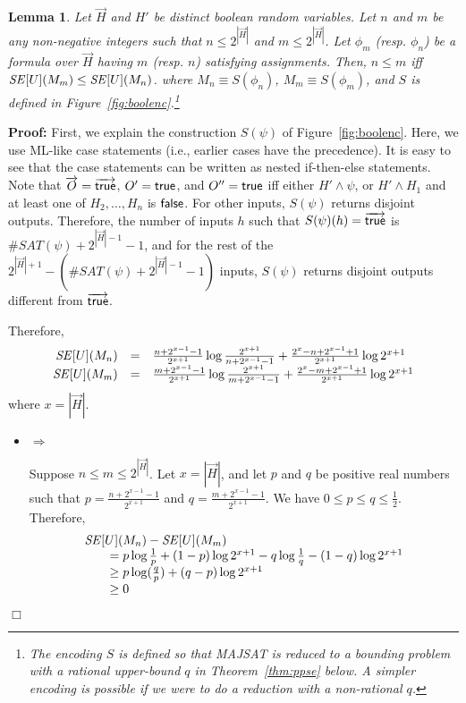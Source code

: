 \documentclass{llncs}
\newtheorem{lemma}[theorem]{Lemma}
\newenvironment{proof}{\noindent\rm{\bf Proof:}}{\hbox{$\Box$}\vspace*{0.2\baselineskip}}
\newcommand{\vect}[1]{\overrightarrow{{#1}}}
\begin{document}
\begin{lemma}
\label{lem:semonotone}
Let $\vect H$ and $H'$ be distinct boolean random variables.  Let $n$
and $m$ be any non-negative integers such that $n\le 2^{|{\vect H}|}$
and $m\le 2^{|\vect{H}|}$.  Let $\phi_m$ (resp. $\phi_n$) be a formula
over $\vect H$ having $m$ (resp. $n$) satisfying assignments. Then,
$n\le m$ iff ${\it SE}[U](M_m)\le{\it SE}[U](M_n)$.  where $M_n\equiv
S(\phi_n)$, $M_m\equiv S(\phi_m)$, and $S$ is defined in
Figure~\ref{fig:boolenc}.\footnote{The encoding $S$ is defined so
    that MAJSAT is reduced to a bounding problem with a rational
    upper-bound $q$ in Theorem~\ref{thm:ppse} below.  A simpler
    encoding is possible if we were to do a reduction with a
    non-rational $q$.}
\end{lemma}
\begin{proof}
  First, we explain the construction $S(\psi)$ of
  Figure~\ref{fig:boolenc}.  Here, we use ML-like case statements
  (i.e., earlier cases have the precedence).  It is easy to see that the case
  statements can be written as nested if-then-else statements. Note
  that $\vect{O}=\vect{\sf true}$, $O'={\sf true}$, and $O''={\sf
    true}$ iff either $H'\wedge \psi$, or $H'\wedge H_1$ and at least
  one of $H_2,\dots,H_n$ is ${\sf false}$.  For other inputs,
  $S(\psi)$ returns disjoint outputs.  Therefore, the number of inputs
  $h$ such that $S(\psi)(h) = \vect{\sf true}$ is $\#SAT(\psi) +
  2^{|\vect{H}|-1} - 1$, and for the rest of the $2^{|\vect{H}|+1} -
  (\#SAT(\psi) + 2^{|\vect{H}|-1} - 1)$ inputs, $S(\psi)$ returns
  disjoint outputs different from $\vect{\sf true}$.

Therefore, 
\[
\begin{array}{rcl}
  {\it SE}[U](M_n)&=&\frac{n + 2^{x-1}-1}{2^{x+1}}\log\frac{2^{x+1}}{n + 2^{x-1}-1} + \frac{2^x - n + 2^{x-1}+1}{2^{x+1}}\log 2^{x+1}\\
  {\it SE}[U](M_m)&=&\frac{m + 2^{x-1}-1}{2^{x+1}}\log\frac{2^{x+1}}{m + 2^{x-1}-1} + \frac{2^x - m + 2^{x-1}+1}{2^{x+1}}\log 2^{x+1}
\end{array}
\]
where $x=|{\vect H}|$.
\begin{itemize}
\item $\Rightarrow$

  Suppose $n\le m\le 2^{|\vect H|}$.  Let $x=|{\vect H}|$, and let $p$
  and $q$ be positive real numbers such that
  $p=\frac{n+2^{x-1}-1}{2^{x+1}}$ and $q=\frac{m+2^{x-1}-1}{2^{x+1}}$.
  We have $0\le p\le q\le \frac{1}{2}$.  Therefore,
\[
\begin{array}{l}
  {\it SE}[U](M_n)-{\it SE}[U](M_m)\\
  \qquad=p\log\frac{1}{p} + (1-p)\log 2^{x+1}
- q\log\frac{1}{q} - (1-q)\log 2^{x+1}\\
  \qquad \ge p\log(\frac{q}{p}) +(q-p)\log 2^{x+1}\\
  \qquad\ge 0
\end{array}
\]


\end{itemize}
\end{proof}
\end{document}
